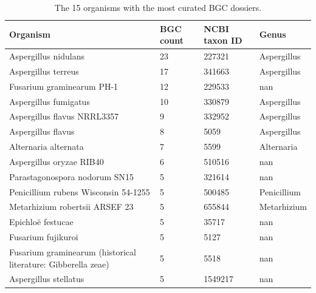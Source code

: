 \begin{table}[htbp]
\centering
\caption{The 15 organisms with the most curated BGC dossiers.}
\label{tab:toptaxa}
\begin{tabular}{l l l l}
\toprule
Organism & BGC count & NCBI taxon ID & Genus \\
\midrule
Aspergillus nidulans & 23 & 227321 & Aspergillus \\
Aspergillus terreus & 17 & 341663 & Aspergillus \\
Fusarium graminearum PH-1 & 12 & 229533 & nan \\
Aspergillus fumigatus & 10 & 330879 & Aspergillus \\
Aspergillus flavus NRRL3357 & 9 & 332952 & Aspergillus \\
Aspergillus flavus & 8 & 5059 & Aspergillus \\
Alternaria alternata & 7 & 5599 & Alternaria \\
Aspergillus oryzae RIB40 & 6 & 510516 & nan \\
Parastagonospora nodorum SN15 & 5 & 321614 & nan \\
Penicillium rubens Wisconsin 54-1255 & 5 & 500485 & Penicillium \\
Metarhizium robertsii ARSEF 23 & 5 & 655844 & Metarhizium \\
Epichloë festucae & 5 & 35717 & nan \\
Fusarium fujikuroi & 5 & 5127 & nan \\
Fusarium graminearum (historical literature: Gibberella zeae) & 5 & 5518 & nan \\
Aspergillus stellatus & 5 & 1549217 & nan \\
\bottomrule
\end{tabular}
\end{table}